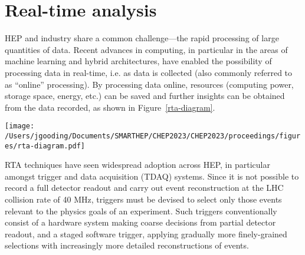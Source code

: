 \section{Real-time analysis}
\label{rta}
HEP and industry share a common challenge—the rapid processing of large quantities of data. \cite{hu-big-data} Recent advances in computing, in particular in the areas of machine learning and hybrid architectures, have enabled the possibility of processing data in real-time, i.e. as data is collected (also commonly referred to as ``online'' processing). \cite{real-time-computing} By processing data online, resources (computing power, storage space, energy, etc.) can be saved and further insights can be obtained from the data recorded, as shown in Figure~\ref{rta-diagram}. \par

\begin{figure*}[h!]
    \centering
    \texttt{[image: /Users/jgooding/Documents/SMARTHEP/CHEP2023/CHEP2023/proceedings/figures/rta-diagram.pdf]}
    \caption{Traditional and RTA approaches to data processing. Traditional approaches rely on recording all data and processing this offilne; in RTA, data is processed as it is produced, recording only the relevant portions, enabling greater volumes of processed data to be stored.}
    \label{rta-diagram}       %
\end{figure*}

RTA techniques have seen widespread adoption across HEP, in particular amongst trigger and data acquisition (TDAQ) systems. Since it is not possible to record a full detector readout and carry out event reconstruction at the LHC collision rate of {40}{ MHz}, triggers must be devised to select only those events relevant to the physics goals of an experiment. Such triggers conventionally consist of a hardware system making coarse decisions from partial detector readout, and a staged software trigger, applying gradually more finely-grained selections with increasingly more detailed reconstructions of events.\par



